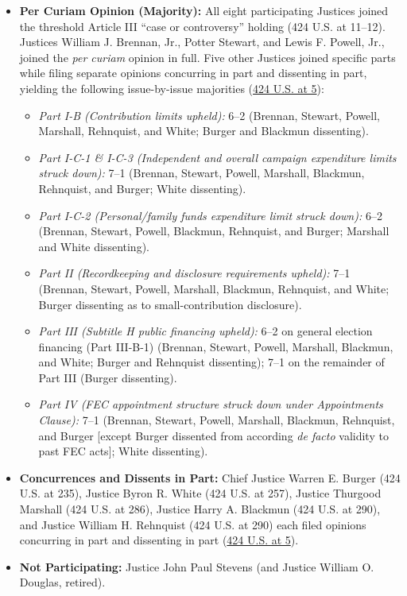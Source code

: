 \documentclass[12pt]{article}
\begin{document}
\begin{itemize}
  \item \textbf{Per Curiam Opinion (Majority):} All eight participating Justices joined the threshold Article III ``case or controversy'' holding (424 U.S. at 11--12). Justices William J. Brennan, Jr., Potter Stewart, and Lewis F. Powell, Jr., joined the \textit{per curiam} opinion in full. Five other Justices joined specific parts while filing separate opinions concurring in part and dissenting in part, yielding the following issue-by-issue majorities (\href{https://supreme.justia.com/cases/federal/us/424/1/}{424 U.S. at 5}):
  \begin{itemize}
    \item \textit{Part I-B (Contribution limits upheld):} 6--2 (Brennan, Stewart, Powell, Marshall, Rehnquist, and White; Burger and Blackmun dissenting).
    \item \textit{Part I-C-1 \& I-C-3 (Independent and overall campaign expenditure limits struck down):} 7--1 (Brennan, Stewart, Powell, Marshall, Blackmun, Rehnquist, and Burger; White dissenting).
    \item \textit{Part I-C-2 (Personal/family funds expenditure limit struck down):} 6--2 (Brennan, Stewart, Powell, Blackmun, Rehnquist, and Burger; Marshall and White dissenting).
    \item \textit{Part II (Recordkeeping and disclosure requirements upheld):} 7--1 (Brennan, Stewart, Powell, Marshall, Blackmun, Rehnquist, and White; Burger dissenting as to small-contribution disclosure).
    \item \textit{Part III (Subtitle H public financing upheld):} 6--2 on general election financing (Part III-B-1) (Brennan, Stewart, Powell, Marshall, Blackmun, and White; Burger and Rehnquist dissenting); 7--1 on the remainder of Part III (Burger dissenting).
    \item \textit{Part IV (FEC appointment structure struck down under Appointments Clause):} 7--1 (Brennan, Stewart, Powell, Marshall, Blackmun, Rehnquist, and Burger [except Burger dissented from according \textit{de facto} validity to past FEC acts]; White dissenting).
  \end{itemize}
  \item \textbf{Concurrences and Dissents in Part:} Chief Justice Warren E. Burger (424 U.S. at 235), Justice Byron R. White (424 U.S. at 257), Justice Thurgood Marshall (424 U.S. at 286), Justice Harry A. Blackmun (424 U.S. at 290), and Justice William H. Rehnquist (424 U.S. at 290) each filed opinions concurring in part and dissenting in part (\href{https://supreme.justia.com/cases/federal/us/424/1/}{424 U.S. at 5}).
  \item \textbf{Not Participating:} Justice John Paul Stevens (and Justice William O. Douglas, retired).
\end{itemize}
\end{document}
